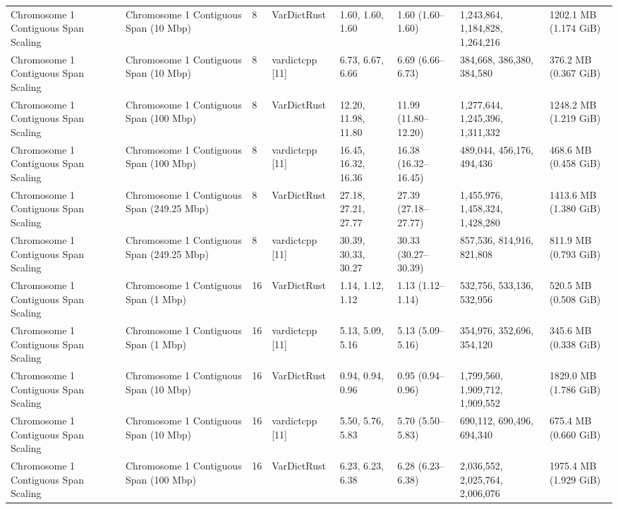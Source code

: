 \begin{table}[htbp]
{\begin{tabular}{llllllll}
Chromosome 1 Contiguous Span Scaling & Chromosome 1 Contiguous Span (10 Mbp) & 8 & VarDictRust & 1.60, 1.60, 1.60 & 1.60 (1.60--1.60) & 1,243,864, 1,184,828, 1,264,216 & 1202.1 MB (1.174 GiB) \\
Chromosome 1 Contiguous Span Scaling & Chromosome 1 Contiguous Span (10 Mbp) & 8 & vardictcpp [11] & 6.73, 6.67, 6.66 & 6.69 (6.66--6.73) & 384,668, 386,380, 384,580 & 376.2 MB (0.367 GiB) \\
Chromosome 1 Contiguous Span Scaling & Chromosome 1 Contiguous Span (100 Mbp) & 8 & VarDictRust & 12.20, 11.98, 11.80 & 11.99 (11.80--12.20) & 1,277,644, 1,245,396, 1,311,332 & 1248.2 MB (1.219 GiB) \\
Chromosome 1 Contiguous Span Scaling & Chromosome 1 Contiguous Span (100 Mbp) & 8 & vardictcpp [11] & 16.45, 16.32, 16.36 & 16.38 (16.32--16.45) & 489,044, 456,176, 494,436 & 468.6 MB (0.458 GiB) \\
Chromosome 1 Contiguous Span Scaling & Chromosome 1 Contiguous Span (249.25 Mbp) & 8 & VarDictRust & 27.18, 27.21, 27.77 & 27.39 (27.18--27.77) & 1,455,976, 1,458,324, 1,428,280 & 1413.6 MB (1.380 GiB) \\
Chromosome 1 Contiguous Span Scaling & Chromosome 1 Contiguous Span (249.25 Mbp) & 8 & vardictcpp [11] & 30.39, 30.33, 30.27 & 30.33 (30.27--30.39) & 857,536, 814,916, 821,808 & 811.9 MB (0.793 GiB) \\
Chromosome 1 Contiguous Span Scaling & Chromosome 1 Contiguous Span (1 Mbp) & 16 & VarDictRust & 1.14, 1.12, 1.12 & 1.13 (1.12--1.14) & 532,756, 533,136, 532,956 & 520.5 MB (0.508 GiB) \\
Chromosome 1 Contiguous Span Scaling & Chromosome 1 Contiguous Span (1 Mbp) & 16 & vardictcpp [11] & 5.13, 5.09, 5.16 & 5.13 (5.09--5.16) & 354,976, 352,696, 354,120 & 345.6 MB (0.338 GiB) \\
Chromosome 1 Contiguous Span Scaling & Chromosome 1 Contiguous Span (10 Mbp) & 16 & VarDictRust & 0.94, 0.94, 0.96 & 0.95 (0.94--0.96) & 1,799,560, 1,909,712, 1,909,552 & 1829.0 MB (1.786 GiB) \\
Chromosome 1 Contiguous Span Scaling & Chromosome 1 Contiguous Span (10 Mbp) & 16 & vardictcpp [11] & 5.50, 5.76, 5.83 & 5.70 (5.50--5.83) & 690,112, 690,496, 694,340 & 675.4 MB (0.660 GiB) \\
Chromosome 1 Contiguous Span Scaling & Chromosome 1 Contiguous Span (100 Mbp) & 16 & VarDictRust & 6.23, 6.23, 6.38 & 6.28 (6.23--6.38) & 2,036,552, 2,025,764, 2,006,076 & 1975.4 MB (1.929 GiB) \\

\end{tabular}}
\end{table}
